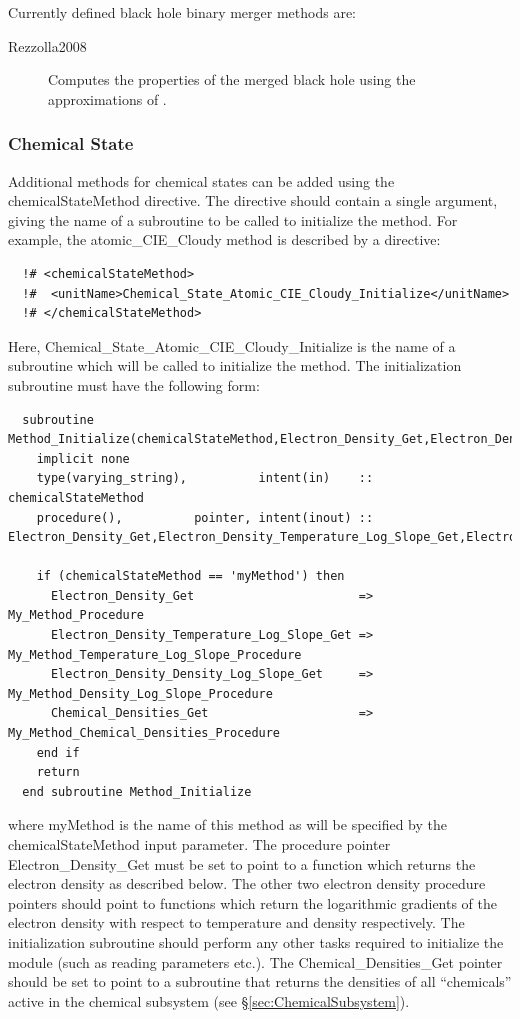 Currently defined black hole binary merger methods are:
\begin{description}
 \item [{\normalfont \ttfamily Rezzolla2008}] Computes the properties of the merged black hole using the approximations of \cite{rezzolla_final_2008}.
\end{description}

\subsubsection{Chemical State}\label{sec:ChemicalStateMethods}

Additional methods for chemical states can be added using the {\normalfont \ttfamily chemicalStateMethod} directive. The directive should contain a single argument, giving the name of a subroutine to be called to initialize the method. For example, the {\normalfont \ttfamily atomic\_CIE\_Cloudy} method is described by a directive:
\begin{verbatim}
  !# <chemicalStateMethod>
  !#  <unitName>Chemical_State_Atomic_CIE_Cloudy_Initialize</unitName>
  !# </chemicalStateMethod>
\end{verbatim}
Here, {\normalfont \ttfamily Chemical\_State\_Atomic\_CIE\_Cloudy\_Initialize} is the name of a subroutine which will be called to initialize the method. The initialization subroutine must have the following form:
\begin{verbatim}
  subroutine Method_Initialize(chemicalStateMethod,Electron_Density_Get,Electron_Density_Temperature_Log_Slope_Get,Electron_Density_Density_Log_Slope_Get,Chemical_Densities_Get)
    implicit none
    type(varying_string),          intent(in)    :: chemicalStateMethod
    procedure(),          pointer, intent(inout) :: Electron_Density_Get,Electron_Density_Temperature_Log_Slope_Get,Electron_Density_Density_Log_Slope_Get
    
    if (chemicalStateMethod == 'myMethod') then
      Electron_Density_Get                       => My_Method_Procedure
      Electron_Density_Temperature_Log_Slope_Get => My_Method_Temperature_Log_Slope_Procedure
      Electron_Density_Density_Log_Slope_Get     => My_Method_Density_Log_Slope_Procedure
      Chemical_Densities_Get                     => My_Method_Chemical_Densities_Procedure
    end if
    return
  end subroutine Method_Initialize
\end{verbatim}
where {\normalfont \ttfamily myMethod} is the name of this method as will be specified by the {\normalfont \ttfamily chemicalStateMethod} input parameter. The procedure pointer {\normalfont \ttfamily Electron\_Density\_Get} must be set to point to a function which returns the electron density as described below. The other two electron density procedure pointers should point to functions which return the logarithmic gradients of the electron density with respect to temperature and density respectively. The initialization subroutine should perform any other tasks required to initialize the module (such as reading parameters etc.). The {\normalfont \ttfamily Chemical\_Densities\_Get} pointer should be set to point to a subroutine that returns the densities of all ``chemicals'' active in the chemical subsystem (see \S\ref{sec:ChemicalSubsystem}).

